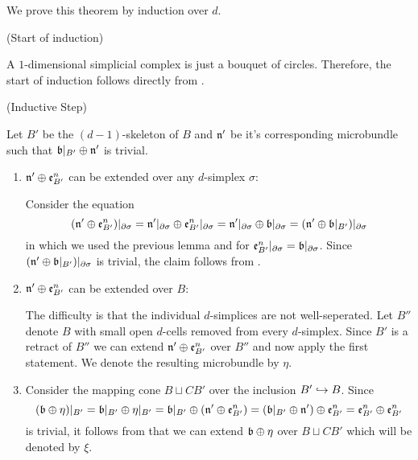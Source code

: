 \begin{myproof}
    We prove this theorem by induction over $d$.

    (Start of induction)

    A $1$-dimensional simplicial complex is just a bouquet of circles.
    Therefore, the start of induction follows directly from .   

    (Inductive Step)

    Let $B'$ be the $(d - 1)$-skeleton of $B$ and $\mathfrak{n}'$ be it's corresponding microbundle
    such that $\mathfrak{b}\vert_{B'} \oplus{} \mathfrak{n}'$ is trivial.

    \begin{enumerate}
        \item $\mathfrak{n}' \oplus{} \mathfrak{e}^{n}_{B'}$ can be extended over any $d$-simplex $\sigma$:

        Consider the equation
        \[
            (\mathfrak{n}' \oplus{} \mathfrak{e}^{n}_{B'})\vert_{\partial\sigma}
            = \mathfrak{n}'\vert_{\partial\sigma} \oplus{} \mathfrak{e}^{n}_{B'}\vert_{\partial\sigma}
            = \mathfrak{n}'\vert_{\partial\sigma} \oplus{} \mathfrak{b}\vert_{\partial\sigma}
            = (\mathfrak{n}' \oplus{} \mathfrak{b}\vert_{B'})\vert_{\partial\sigma}
        \]
        in which we used the previous lemma and 
        for $\mathfrak{e}^{n}_{B'}\vert_{\partial\sigma} = \mathfrak{b}\vert_{\partial\sigma}$.
        Since $(\mathfrak{n}' \oplus{} \mathfrak{b}\vert_{B'})\vert_{\partial\sigma}$ is trivial, the claim follows from .

        \item $\mathfrak{n}' \oplus{} \mathfrak{e}^{n}_{B'}$ can be extended over $B$:

        The difficulty is that the individual $d$-simplices are not well-seperated.
        Let $B''$ denote $B$ with small open $d$-cells removed from every $d$-simplex.
        Since $B'$ is a retract of $B''$ we can extend $\mathfrak{n}' \oplus{} \mathfrak{e}^{n}_{B'}$ over $B''$ and now apply the first statement.
        We denote the resulting microbundle by $\eta$.

        \item
        Consider the mapping cone $B \sqcup CB'$ over the inclusion $B' \hookrightarrow{} B$.
        Since
        \[
            (\mathfrak{b} \oplus{} \eta)\vert_{B'}
            = \mathfrak{b}\vert_{B'} \oplus{} \eta\vert_{B'}
            = \mathfrak{b}\vert_{B'} \oplus{} (\mathfrak{n}' \oplus{} \mathfrak{e}^{n}_{B'})
            = (\mathfrak{b}\vert_{B'} \oplus{} \mathfrak{n}') \oplus{} \mathfrak{e}^{n}_{B'}
            = \mathfrak{e}^{n}_{B'} \oplus{} \mathfrak{e}^{n}_{B'}
        \]
        is trivial, it follows from  that we can extend $\mathfrak{b} \oplus{} \eta$ over $B \sqcup CB'$
        which will be denoted by $\xi$.


\end{enumerate}
\end{myproof}
